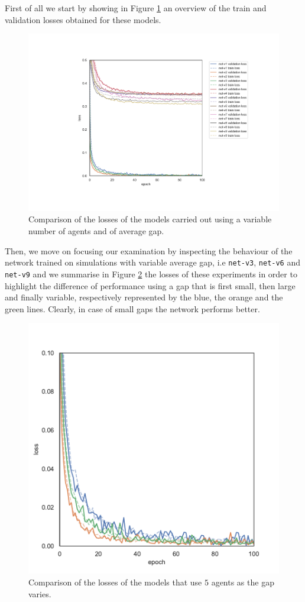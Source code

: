 First of all we start by showing in Figure \ref{fig:t2lossallt} an overview of the train 
and validation losses obtained for these models.
\begin{figure}[!htb]
	\centering
	\includegraphics[width=.8\textwidth]{contents/images/task2/loss-communication-all@}%
	\caption[Comparison of losses of the second set of experiments.]{Comparison 
		of the losses of the models carried out using a variable number of agents and 
		of average gap.}
	\label{fig:t2lossallt}
\end{figure}
Then, we move on focusing our examination by inspecting the behaviour of the 
network trained on simulations with variable average gap, i.e \texttt{net-v3}, 
\texttt{net-v6} and \texttt{net-v9} and we summarise in Figure 
\ref{fig:commlossn5t2} the losses of these experiments in order to highlight the 
difference of performance using a gap that is first small, then large and finally 
variable, respectively represented by the blue, the orange and the green lines.
Clearly, in case of small gaps the network performs better. 
\begin{figure}[!htb]
	\centering
	\includegraphics[width=.4\textwidth]{contents/images/task2/loss-communication-N5}
	\caption{Comparison of the losses of the models that use $5$ agents as the gap 
		varies.}
	\label{fig:commlossn5t2}
\end{figure}
	
